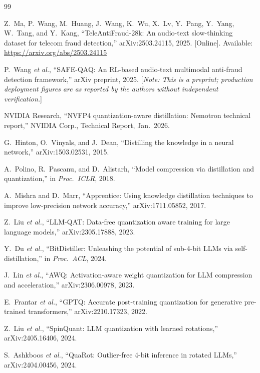 \documentclass[lettersize,journal]{IEEEtran}
\begin{document}

\begin{thebibliography}{99}

Z.~Ma, P.~Wang, M.~Huang, J.~Wang, K.~Wu, X.~Lv, Y.~Pang, Y.~Yang,
W.~Tang, and Y.~Kang, ``TeleAntiFraud-28k: An audio-text slow-thinking
dataset for telecom fraud detection,'' arXiv:2503.24115, 2025.
[Online]. Available: \url{https://arxiv.org/abs/2503.24115}

P.~Wang \textit{et al.}, ``SAFE-QAQ: An RL-based audio-text
multimodal anti-fraud detection framework,'' arXiv preprint, 2025.
[\textit{Note: This is a preprint; production deployment figures are
as reported by the authors without independent verification.}]

NVIDIA Research, ``NVFP4 quantization-aware distillation: Nemotron
technical report,'' NVIDIA Corp., Technical Report, Jan.\ 2026.

G.~Hinton, O.~Vinyals, and J.~Dean, ``Distilling the knowledge in a
neural network,'' arXiv:1503.02531, 2015.

A.~Polino, R.~Pascanu, and D.~Alistarh, ``Model compression via
distillation and quantization,'' in \emph{Proc.\ ICLR}, 2018.

A.~Mishra and D.~Marr, ``Apprentice: Using knowledge distillation
techniques to improve low-precision network accuracy,''
arXiv:1711.05852, 2017.

Z.~Liu \textit{et al.}, ``LLM-QAT: Data-free quantization aware
training for large language models,'' arXiv:2305.17888, 2023.

Y.~Du \textit{et al.}, ``BitDistiller: Unleashing the potential of
sub-4-bit LLMs via self-distillation,'' in \emph{Proc.\ ACL}, 2024.

J.~Lin \textit{et al.}, ``AWQ: Activation-aware weight quantization
for LLM compression and acceleration,'' arXiv:2306.00978, 2023.

E.~Frantar \textit{et al.}, ``GPTQ: Accurate post-training
quantization for generative pre-trained transformers,''
arXiv:2210.17323, 2022.

Z.~Liu \textit{et al.}, ``SpinQuant: LLM quantization with learned
rotations,'' arXiv:2405.16406, 2024.

S.~Ashkboos \textit{et al.}, ``QuaRot: Outlier-free 4-bit inference
in rotated LLMs,'' arXiv:2404.00456, 2024.


\end{thebibliography}
\end{document}

